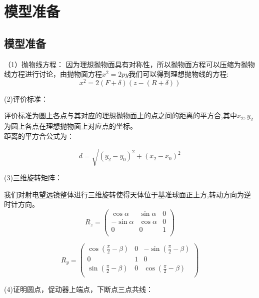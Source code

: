 \documentclass[withoutpreface,bwprint]{cumcmthesis} %
\numberwithin{equation}{subsection}
\begin{document}
\section{模型准备}

\subsection{模型准备}
（1）抛物线方程：
因为理想抛物面具有对称性，所以抛物面方程可以压缩为抛物线方程进行讨论，由抛物面方程$x^2=2py$我们可以得到理想抛物线的方程:
\begin{equation}
	x^2=2(F+\delta)(z-(R+\delta))
\end{equation}


(2)评价标准：

评价标准为圆上各点与其对应的理想抛物面上的点之间的距离的平方合,其中$x_2{},y_2{}$为圆上各点在理想抛物面上对应点的坐标。\\距离的平方合公式为：

\begin{equation}
	d=\sqrt{(y_2-y_0)^{2}+(x_2-x_0)^{2}}
\end{equation}

(3)三维旋转矩阵：

我们对射电望远镜整体进行三维旋转使得天体位于基准球面正上方,转动方向为逆时针方向。
\begin{equation}
	R_{z}=\left(
	\begin{matrix}
		\cos\alpha & \sin\alpha & 0\\
		-\sin\alpha & \cos\alpha & 0\\
		0 & 0 & 1\\
	\end{matrix}\right)
\end{equation}

\begin{equation}
	R_{y}=\left(
	\begin{matrix}
		\cos(\frac{\pi}{2}-\beta) & 0 & -\sin(\frac{\pi}{2}-\beta)\\
		0 & 1 & 0\\
		\sin(\frac{\pi}{2}-\beta) & 0 & \cos(\frac{\pi}{2}-\beta)\\
	\end{matrix}\right)
\end{equation}

(4)证明圆点，促动器上端点，下断点三点共线：
\end{document}
